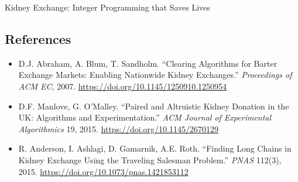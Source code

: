 \begin{casestudybox}{Kidney Exchange: Integer Programming that Saves Lives}
\subsection*{References}
\begin{itemize}
\item D.J. Abraham, A. Blum, T. Sandholm. ``Clearing Algorithms for Barter Exchange Markets: Enabling Nationwide Kidney Exchanges.'' \emph{Proceedings of ACM EC}, 2007. \url{https://doi.org/10.1145/1250910.1250954}
\item D.F. Manlove, G. O'Malley. ``Paired and Altruistic Kidney Donation in the UK: Algorithms and Experimentation.'' \emph{ACM Journal of Experimental Algorithmics} 19, 2015. \url{https://doi.org/10.1145/2670129}
\item R. Anderson, I. Ashlagi, D. Gamarnik, A.E. Roth. ``Finding Long Chains in Kidney Exchange Using the Traveling Salesman Problem.'' \emph{PNAS} 112(3), 2015. \url{https://doi.org/10.1073/pnas.1421853112}
\end{itemize}
\end{casestudybox}

